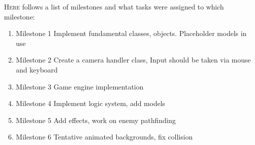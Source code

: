 \lettrine[lines=1]{\color{Crimson}H}{ere} follows a list of milestones and what tasks were assigned to which milestone:
\begin{enumerate}
\item Milestone 1
\noindent Implement fundamental classes, objects. Placeholder models in use
\item Milestone 2
\noindent Create a camera handler class, Input should be taken via mouse and keyboard
\item Milestone 3
\noindent Game engine implementation
\item Milestone 4
\noindent Implement logic system, add models
\item Milestone 5
\noindent Add effects, work on enemy pathfinding
\item Milestone 6
\noindent Tentative animated backgrounds, fix collision
\end{enumerate}